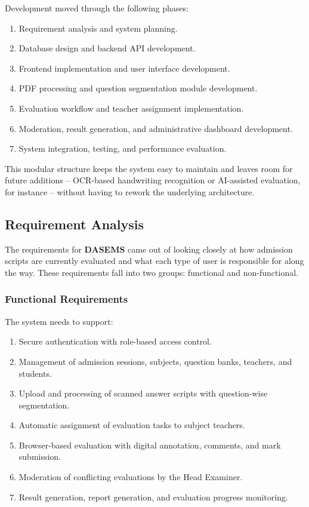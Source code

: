 Development moved through the following phases:

\begin{enumerate}

\item Requirement analysis and system planning.

\item Database design and backend API development.

\item Frontend implementation and user interface development.

\item PDF processing and question segmentation module development.

\item Evaluation workflow and teacher assignment implementation.

\item Moderation, result generation, and administrative dashboard development.

\item System integration, testing, and performance evaluation.

\end{enumerate}

This modular structure keeps the system easy to maintain and leaves room for future additions -- OCR-based handwriting recognition or AI-assisted evaluation, for instance -- without having to rework the underlying architecture.

\subsection{Requirement Analysis}

The requirements for \textbf{DASEMS} came out of looking closely at how admission scripts are currently evaluated and what each type of user is responsible for along the way. These requirements fall into two groups: functional and non-functional.

\subsubsection{Functional Requirements}

The system needs to support:

\begin{enumerate}
    \item Secure authentication with role-based access control.
    \item Management of admission sessions, subjects, question banks, teachers, and students.
    \item Upload and processing of scanned answer scripts with question-wise segmentation.
    \item Automatic assignment of evaluation tasks to subject teachers.
    \item Browser-based evaluation with digital annotation, comments, and mark submission.
    \item Moderation of conflicting evaluations by the Head Examiner.
    \item Result generation, report generation, and evaluation progress monitoring.
\end{enumerate}

